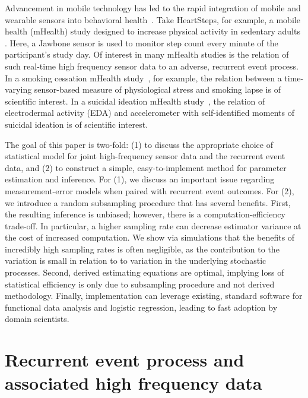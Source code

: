 \documentclass[11pt]{amsart}
\begin{document}
Advancement in mobile technology has led to the rapid integration of mobile and wearable sensors into behavioral health~\citep{Freeetal2013}. Take HeartSteps, for example, a mobile health (mHealth) study designed to increase physical activity in sedentary adults \citep{KlasnjaHS2019}. Here, a Jawbone sensor is used to monitor step count every minute of the participant's study day. Of interest in many mHealth studies is the relation of such real-time high frequency sensor data to an adverse, recurrent event process. In a smoking cessation mHealth study~\citep{Sense2Stop}, for example, the relation between a time-varying sensor-based measure of physiological stress and smoking lapse is of scientific interest. In a suicidal ideation mHealth study~\citep{Kleiman2018}, the relation of electrodermal activity (EDA) and accelerometer with self-identified moments of suicidal ideation is of scientific interest.

The goal of this paper is two-fold: (1) to discuss the appropriate choice of statistical model for joint high-frequency sensor data and the recurrent event data, and (2) to construct a simple, easy-to-implement method for parameter estimation and inference. For (1), we discuss an important issue regarding measurement-error models when paired with recurrent event outcomes. For (2), we introduce a random subsampling procedure that has several benefits.  First, the resulting inference is unbiased; however, there is a computation-efficiency trade-off. In particular, a higher sampling rate can decrease estimator variance at the cost of increased computation.  We show via simulations that the benefits of incredibly high sampling rates is often negligible, as the contribution to the variation is small in relation to to variation in the underlying stochastic processes. Second, derived estimating equations are optimal, implying loss of statistical efficiency is only due to subsampling procedure and not derived methodology.  Finally, implementation can leverage existing, standard software for functional data analysis and logistic regression, leading to fast adoption by domain scientists.

\section{Recurrent event process and associated high frequency data}
\end{document}
